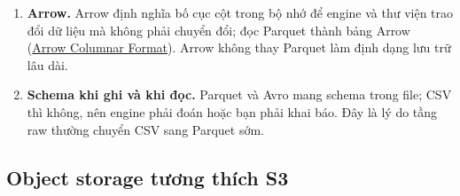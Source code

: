\begin{enumerate}
  \item \textbf{Arrow.} Arrow định nghĩa bố cục cột trong bộ nhớ để engine và thư viện trao đổi dữ liệu mà không phải chuyển đổi;  đọc Parquet thành bảng Arrow (\href{https://arrow.apache.org/docs/format/Columnar.html}{Arrow Columnar Format}). Arrow không thay Parquet làm định dạng lưu trữ lâu dài.
  \item \textbf{Schema khi ghi và khi đọc.} Parquet và Avro mang schema trong file; CSV thì không, nên engine phải đoán hoặc bạn phải khai báo. Đây là lý do tầng raw thường chuyển CSV sang Parquet sớm.
\end{enumerate}

\subsection{Object storage tương thích S3}
